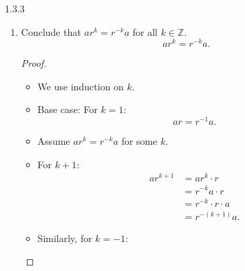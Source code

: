 \documentclass[12pt]{amsart}
\theoremstyle{definition}
\numberwithin{equation}{section}
\begin{document}
\begin{exercise}{1.3.3}
\begin{enumerate}[label=\alph*.]
            \begin{proof} \( \)
                \begin{itemize}[label=--]
                    \item Consider \(ar\): Rotate by 90° counterclockwise (apply \(r\)) and then reflect across the vertical axis (apply \(a\)).
                    \item This is equivalent to reflecting first (apply \(a\)) and then rotating by 90° clockwise (apply \(r^{-1}\)).
                    \item Therefore, \(ar = r^{-1}a\).
                    \item Since \(r^{-1} = r^3\) in a modulo 4 system (as \(r^4 = e\)), we have:
                    \begin{equation*}
                    ar = r^{-1}a = r^3a.
                    \end{equation*}
                \end{itemize}
            \end{proof}
                \item Conclude that \(ar^k = r^{-k}a\) for all \(k \in \mathbb{Z}\).
                \begin{equation*}
                ar^k = r^{-k}a.
                \end{equation*}
            \begin{proof} \( \)
                \begin{itemize}[label=--]
                    \item We use induction on \(k\).
                    \item Base case: For \(k = 1\):
                    \begin{equation*}
                    ar = r^{-1}a.
                    \end{equation*}
                    \item Assume \(ar^k = r^{-k}a\) for some \(k\).
                    \item For \(k + 1\):
                    \begin{align*}
                    ar^{k+1} &= ar^k \cdot r \\
                             &= r^{-k}a \cdot r \\
                             &= r^{-k} \cdot r \cdot a \\
                             &= r^{-(k+1)}a.
                    \end{align*}
                    \item Similarly, for \(k = -1\):

\end{itemize}
\end{proof}
\end{enumerate}
\end{exercise}
\end{document}
